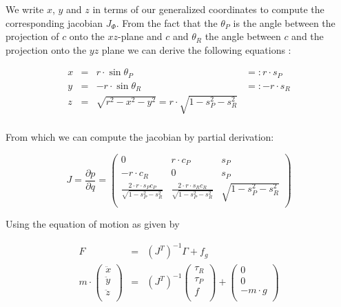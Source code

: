 \documentclass[english,ngerman]{KITreprt}
\begin{document}
We write $x$, $y$ and $z$ in terms of our generalized coordinates to
compute the corresponding jacobian $J_\Phi$. From the fact that the
$\theta_P$ is the angle between the projection of $c$ onto the
$xz$-plane and $c$ and $\theta_R$ the angle between $c$ and the
projection onto the $yz$ plane we can derive the following equations
\cite{kajita20013d}:

\begin{equation}
\begin{array}{lcll} \label{eq:lip-xyz}
x & = & r \cdot \sin \theta_P & =: r \cdot s_P\\
y & = & -r \cdot \sin \theta_R & =: -r \cdot s_R \\
z & = & \sqrt{r^2 - x^2 - y^2} = r \cdot \sqrt{1 - s_P^2 - s_R^2} & \\
\end{array}
\end{equation}

From which we can compute the jacobian by partial derivation:

\begin{equation} \label{eq:lip-jacobian}
J = \frac{\partial p}{\partial q} = \left( \begin{array}{rcl}
0 & r \cdot c_P & s_P \\
-r \cdot c_R & 0 & s_P \\
\frac{2 \cdot r \cdot s_P c_P}{\sqrt{1 - s_P^2 - s_R^2}} & \frac{2 \cdot r \cdot s_R c_R}{\sqrt{1 - s_P^2 - s_R^2}} & \sqrt{1 - s_P^2 - s_R^2}\\
\end{array}
\right)
\end{equation}

Using the equation of motion as given by

\begin{equation}
\begin{array}{lcr}
F & = & (J^T)^{-1} \Gamma + f_g \\
m \cdot
\left(\begin{array}{c}
\ddot x \\
\ddot y \\
\ddot z \\
\end{array}\right)
& = & (J^T)^{-1}
\left(\begin{array}{c}
\tau_R \\
\tau_P \\
f \\
\end{array}\right)
+
\left(\begin{array}{c}
0 \\
0 \\
-m \cdot g \\
\end{array}\right) \\
\end{array}
\end{equation}
\end{document}
